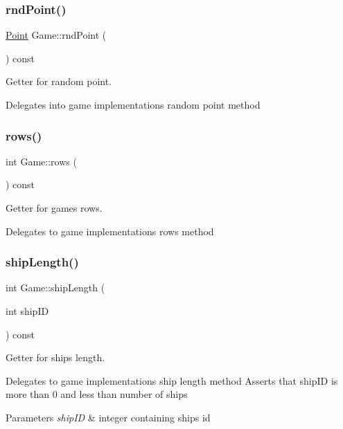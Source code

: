 \subsubsection{\texorpdfstring{rnd\+Point()}{rndPoint()}}
{\footnotesize\ttfamily \mbox{\hyperlink{class_point}{Point}} Game\+::rnd\+Point (\begin{DoxyParamCaption}{ }\end{DoxyParamCaption}) const}



Getter for random point. 

Delegates into game implementation\textquotesingle{}s random point method \mbox{\label{class_game_a0a0531ce88923b4fbe2b3fea4c9d27f5}} 
\subsubsection{\texorpdfstring{rows()}{rows()}}
{\footnotesize\ttfamily int Game\+::rows (\begin{DoxyParamCaption}{ }\end{DoxyParamCaption}) const}



Getter for game\textquotesingle{}s rows. 

Delegates to game implementations rows method \mbox{\label{class_game_af447d664cda0ae50f98afaa1e75ec0e3}} 
\subsubsection{\texorpdfstring{ship\+Length()}{shipLength()}}
{\footnotesize\ttfamily int Game\+::ship\+Length (\begin{DoxyParamCaption}\item[{int}]{ship\+ID }\end{DoxyParamCaption}) const}



Getter for ship\textquotesingle{}s length. 

Delegates to game implementations ship length method Asserts that ship\+ID is more than 0 and less than number of ships 
\begin{DoxyParams}{Parameters}
{\em ship\+ID} & integer containing ship\textquotesingle{}s id \\
\hline
\end{DoxyParams}
\mbox{\label{class_game_aa652b00557acd25657c4aeface33d29a}} 
